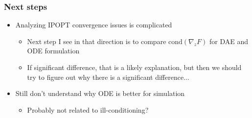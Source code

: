 \documentclass[]{beamer}
\begin{document}
\begin{frame}
\frametitle{Next steps}
\begin{itemize}
\item
Analyzing IPOPT convergence issues is complicated
\begin{itemize}
\item
Next step I see in that direction is to compare $\text{cond}(\nabla_z F)$ for DAE and ODE formulation
\item
If significant difference, that is a likely explanation, but then we should try to figure out why there is a significant difference...
\end{itemize}
\item
Still don't understand why ODE is better for simulation
\begin{itemize}
\item
Probably not related to ill-conditioning?
\end{itemize}
\end{itemize}
\end{frame}
\end{document}
